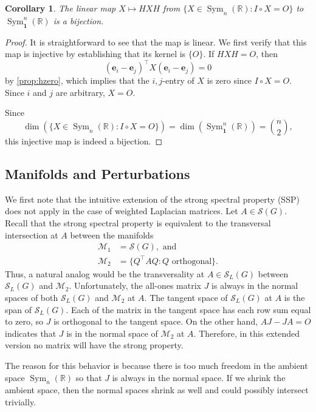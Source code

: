 \documentclass{article}
\newtheorem{corollary}[theorem]{Corollary}
\theoremstyle{definition}
\newcommand{\trans}{^\top}
\newcommand{\bone}{\mathbf{1}}
\newcommand{\be}{\mathbf{e}}
\newcommand{\msym}[1][n]{\operatorname{Sym}_{#1}(\mathbb{R})}
\newcommand{\msymz}[1][n]{\operatorname{Sym}_{\bone}^{#1}(\mathbb{R})}
\newcommand{\mptn}{\mathcal{S}}
\begin{document}
\begin{corollary}
\label{cor:hbij}
The linear map $X\mapsto HXH$ from $\{X\in\msym: I\circ X = O\}$ to $\msymz$ is a bijection. 
\end{corollary}
\begin{proof}
It is straightforward to see that the map is linear.  We first verify that this map is injective by establishing that its kernel is $\{O\}$.  If $HXH = O$, then  
\[
    (\be_i - \be_j)\trans X (\be_i - \be_j) = 0 
\]
by \cref{prop:hzero}, which implies that the $i,j$-entry of $X$ is zero since $I\circ X = O$.  Since $i$ and $j$ are arbitrary, $X = O$.

Since 
\[
    \dim(\{X\in\msym: I\circ X = O\}) = \dim(\msymz) = \binom{n}{2},
\]
this injective map is indeed a bijection.
\end{proof}

\subsection{Manifolds and Perturbations}

We first note that the intuitive extension of the strong spectral property (SSP) does not apply in the case of weighted Laplacian matrices.  Let $A\in\mptn(G)$.  Recall that the strong spectral property \cite{IEPG2, gSAP} is equivalent to the transversal intersection at $A$ between the manifolds
\[
    \begin{aligned}
        \mathcal{M}_1 &= \mptn(G), \text{ and } \\
        \mathcal{M}_2 &= \{Q\trans AQ: Q \text{ orthogonal}\}.
    \end{aligned}
\]
Thus, a natural analog would be the transversality at $A\in\mptn_L(G)$ between $\mptn_L(G)$ and $\mathcal{M}_2$.  Unfortunately, the all-ones matrix $J$ is always in the normal spaces of both $\mptn_L(G)$ and $\mathcal{M}_2$ at $A$.  The tangent space of $\mptn_L(G)$ at $A$ is the span of $\mptn_L(G)$.  Each of the matrix in the tangent space has each row sum equal to zero, so $J$ is orthogonal to the tangent space.  On the other hand, $AJ - JA = O$ indicates that $J$ is in the normal space of $\mathcal{M}_2$ at $A$.  Therefore, in this extended version no matrix will have the strong property.  

The reason for this behavior is because there is too much freedom in the ambient space $\msym$ so that $J$ is always in the normal space.  If we shrink the ambient space, then the normal spaces shrink as well and could possibly intersect trivially.  
\end{document}

